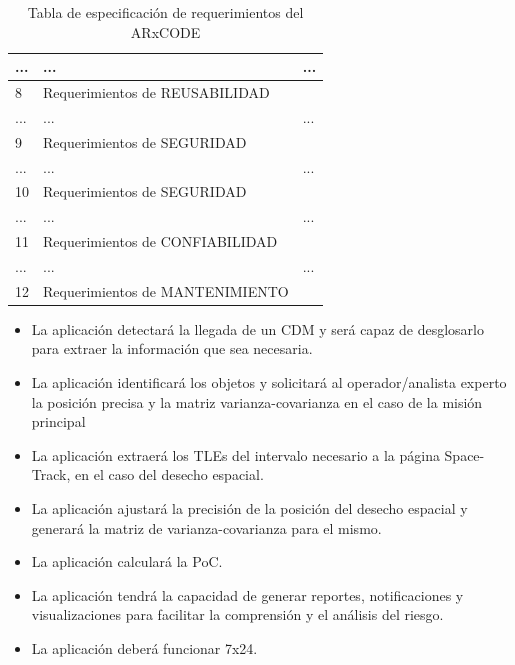\begin{table}
{\begin{tabular}{|l|l|l|}
  \hline
  ...&...&...\\
  \hline
  8 & Requerimientos de REUSABILIDAD & \\
  \hline
  ...&...&...\\
  \hline
  9 & Requerimientos de SEGURIDAD & \\
  \hline
  ...&...&...\\
  \hline
  10 & Requerimientos de SEGURIDAD & \\
  \hline
    ...&...&...\\
  \hline
  11 & Requerimientos de CONFIABILIDAD & \\
  \hline
  ...&...&...\\
  \hline
  12 & Requerimientos de MANTENIMIENTO & \\
  \hline
 \end{tabular}
 }
 \caption[Tabla de Requerimientos]{Tabla de especificaci\'on de requerimientos del ARxCODE}
\end{table}

\begin{itemize}
\item La aplicaci\'on detectar\'a la llegada de un CDM y ser\'a capaz de desglosarlo para extraer la informaci\'on que sea necesaria.\\
\item La aplicaci\'on identificar\'a los objetos y solicitar\'a al operador/analista experto la posici\'on precisa y la matriz varianza-covarianza en el caso de la misi\'on principal\\
\item La aplicaci\'on extraer\'a los TLEs del intervalo necesario a la p\'agina Space-Track, en el caso del desecho espacial.\\
\item La aplicaci\'on ajustar\'a la precisi\'on de la posici\'on del desecho espacial y generar\'a la matriz de varianza-covarianza para el mismo.\\
\item La aplicaci\'on calcular\'a la PoC.\\
\item La aplicaci\'on tendr\'a la capacidad de generar reportes, notificaciones y visualizaciones para facilitar la comprensi\'on y el an\'alisis del riesgo.
\item La aplicaci\'on deber\'a funcionar 7x24.
\end{itemize}


